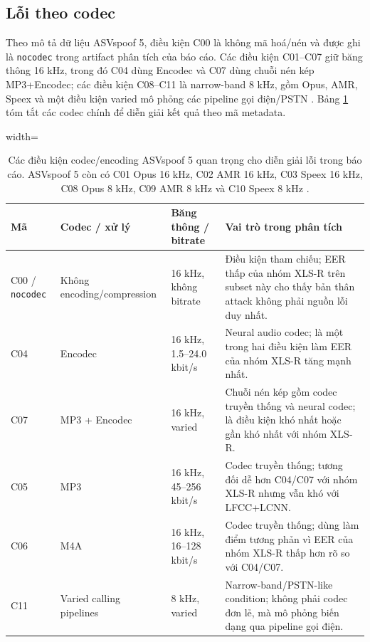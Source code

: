 \subsection{Lỗi theo codec} \label{subsec:asv5-codec-errors}

Theo mô tả dữ liệu ASVspoof 5, điều kiện C00 là không mã hoá/nén và được ghi là \texttt{nocodec} trong artifact phân tích của báo cáo. Các điều kiện C01--C07 giữ băng thông 16 kHz, trong đó C04 dùng Encodec và C07 dùng chuỗi nén kép MP3+Encodec; các điều kiện C08--C11 là narrow-band 8 kHz, gồm Opus, AMR, Speex và một điều kiện varied mô phỏng các pipeline gọi điện/PSTN \cite{asvspoof5_design}. Bảng \ref{tab:asv5-codec-map} tóm tắt các codec chính để diễn giải kết quả theo mã metadata.

\begin{table}[H]
    \centering
    \footnotesize
    \begin{adjustbox}{width=\textwidth}
    \begin{tabular}{p{1.8cm}|p{3.0cm}|p{3.0cm}|p{7.6cm}}
        \textbf{Mã} & \textbf{Codec / xử lý} & \textbf{Băng thông / bitrate} & \textbf{Vai trò trong phân tích}
        \\ \hline
        C00 / \texttt{nocodec} & Không encoding/compression & 16 kHz, không bitrate & Điều kiện tham chiếu; EER thấp của nhóm XLS-R trên subset này cho thấy bản thân attack không phải nguồn lỗi duy nhất.
        \\ \hline
        C04 & Encodec & 16 kHz, 1.5--24.0 kbit/s & Neural audio codec; là một trong hai điều kiện làm EER của nhóm XLS-R tăng mạnh nhất.
        \\ \hline
        C07 & MP3 + Encodec & 16 kHz, varied & Chuỗi nén kép gồm codec truyền thống và neural codec; là điều kiện khó nhất hoặc gần khó nhất với nhóm XLS-R.
        \\ \hline
        C05 & MP3 & 16 kHz, 45--256 kbit/s & Codec truyền thống; tương đối dễ hơn C04/C07 với nhóm XLS-R nhưng vẫn khó với LFCC+LCNN.
        \\ \hline
        C06 & M4A & 16 kHz, 16--128 kbit/s & Codec truyền thống; dùng làm điểm tương phản vì EER của nhóm XLS-R thấp hơn rõ so với C04/C07.
        \\ \hline
        C11 & Varied calling pipelines & 8 kHz, varied & Narrow-band/PSTN-like condition; không phải codec đơn lẻ, mà mô phỏng biến dạng qua pipeline gọi điện.
    \end{tabular}
    \end{adjustbox}
    \caption{Các điều kiện codec/encoding ASVspoof 5 quan trọng cho diễn giải lỗi trong báo cáo. ASVspoof 5 còn có C01 Opus 16 kHz, C02 AMR 16 kHz, C03 Speex 16 kHz, C08 Opus 8 kHz, C09 AMR 8 kHz và C10 Speex 8 kHz \cite{asvspoof5_design}.}
    \label{tab:asv5-codec-map}
\end{table}

